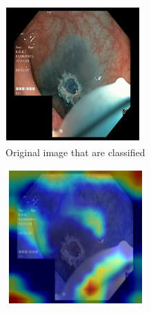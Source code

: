 \begin{figure}
     \centering
     \begin{subfigure}[b]{0.3\textwidth}
         \centering
         \includegraphics[width=\textwidth]{methodology/figures/sal4.png}
         \caption{Original image that are classified}
         \label{fig:sal4}
     \end{subfigure}
     \hfill
     \begin{subfigure}[b]{0.3\textwidth}
         \centering
         \includegraphics[width=\textwidth]{methodology/figures/sal5.png}

\end{subfigure}
\end{figure}
